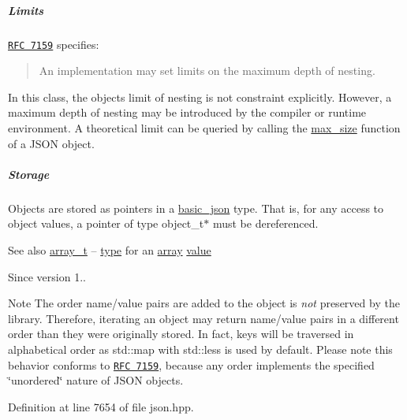 \subparagraph*{Limits}

\href{http://rfc7159.net/rfc7159}{\tt R\+FC 7159} specifies\+: \begin{quote}
An implementation may set limits on the maximum depth of nesting. \end{quote}


In this class, the object\textquotesingle{}s limit of nesting is not constraint explicitly. However, a maximum depth of nesting may be introduced by the compiler or runtime environment. A theoretical limit can be queried by calling the \hyperlink{classnlohmann_1_1basic__json_a2f47d3c6a441c57dd2be00449fbb88e1}{max\+\_\+size} function of a J\+S\+ON object.

\subparagraph*{Storage}

Objects are stored as pointers in a \hyperlink{classnlohmann_1_1basic__json}{basic\+\_\+json} type. That is, for any access to object values, a pointer of type {\ttfamily object\+\_\+t$\ast$} must be dereferenced.

\begin{DoxySeeAlso}{See also}
\hyperlink{classnlohmann_1_1basic__json_a4c409f1b6d9caf3412c78af9a5883fed}{array\+\_\+t} -- \hyperlink{classnlohmann_1_1basic__json_a2b2d781d7f2a4ee41bc0016e931cadf7}{type} for an \hyperlink{classnlohmann_1_1basic__json_aa80485befaffcadaa39965494e0b4d2e}{array} \hyperlink{classnlohmann_1_1basic__json_a9fa223b26419f018f9b18cc516e3a8e5}{value}
\end{DoxySeeAlso}
\begin{DoxySince}{Since}
version 1..
\end{DoxySince}
\begin{DoxyNote}{Note}
The order name/value pairs are added to the object is {\itshape not} preserved by the library. Therefore, iterating an object may return name/value pairs in a different order than they were originally stored. In fact, keys will be traversed in alphabetical order as {\ttfamily std\+::map} with {\ttfamily std\+::less} is used by default. Please note this behavior conforms to \href{http://rfc7159.net/rfc7159}{\tt R\+FC 7159}, because any order implements the specified \char`\"{}unordered\char`\"{} nature of J\+S\+ON objects. 
\end{DoxyNote}


Definition at line 7654 of file json.\+hpp.

